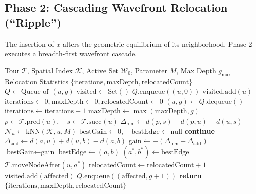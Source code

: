 \documentclass{article}
\theoremstyle{definition}
\begin{document}
\subsection{Phase 2: Cascading Wavefront Relocation (``Ripple'')}

The insertion of $x$ alters the geometric equilibrium of its neighborhood. Phase 2 executes a breadth-first wavefront cascade.

\begin{algorithm}[!htbp]
\caption{\textbf{Ripple Wavefront Relocation Cascade}}
\label{alg:ripple}
\begin{algorithmic}[1]
\REQUIRE Tour $\mathcal{T}$, Spatial Index $\mathcal{K}$, Active Set $\mathcal{W}_0$, Parameter $M$, Max Depth $g_{\max}$
\ENSURE Relocation Statistics $\{\text{iterations}, \text{maxDepth}, \text{relocatedCount}\}$
\STATE $Q \leftarrow \text{Queue of } (u, g)$
\STATE $\text{visited} \leftarrow \text{Set}()$
    \STATE $Q.\text{enqueue}((u, 0))$
    \STATE $\text{visited}.\text{add}(u)$
\ENDFOR
\STATE $\text{iterations} \leftarrow 0, \text{maxDepth} \leftarrow 0, \text{relocatedCount} \leftarrow 0$
    \STATE $(u, g) \leftarrow Q.\text{dequeue}()$
    \STATE $\text{iterations} \leftarrow \text{iterations} + 1$
    \STATE $\text{maxDepth} \leftarrow \max(\text{maxDepth}, g)$
    \STATE $p \leftarrow \mathcal{T}.\text{pred}(u), \quad s \leftarrow \mathcal{T}.\text{succ}(u)$
    \STATE $\Delta_{\text{rem}} \leftarrow d(p, s) - d(p, u) - d(u, s)$
    \STATE $\mathcal{N}_u \leftarrow \text{kNN}(\mathcal{K}, u, M)$
    \STATE $\text{bestGain} \leftarrow 0, \quad \text{bestEdge} \leftarrow \text{null}$
                \STATE \textbf{continue}
            \ENDIF
            \STATE $\Delta_{\text{add}} \leftarrow d(a, u) + d(u, b) - d(a, b)$
            \STATE $\text{gain} \leftarrow -(\Delta_{\text{rem}} + \Delta_{\text{add}})$
                \STATE $\text{bestGain} \leftarrow \text{gain}$
                \STATE $\text{bestEdge} \leftarrow (a, b)$
            \ENDIF
        \ENDFOR
    \ENDFOR
        \STATE $(a^*, b^*) \leftarrow \text{bestEdge}$
        \STATE $\mathcal{T}.\text{moveNodeAfter}(u, a^*)$ 
        \STATE $\text{relocatedCount} \leftarrow \text{relocatedCount} + 1$
                    \STATE $\text{visited}.\text{add}(\text{affected})$
                    \STATE $Q.\text{enqueue}((\text{affected}, g + 1))$
                \ENDIF
            \ENDFOR
        \ENDIF
    \ENDIF
\ENDWHILE
\STATE \textbf{return} $\{\text{iterations}, \text{maxDepth}, \text{relocatedCount}\}$
\end{algorithmic}
\end{algorithm}
\end{document}
